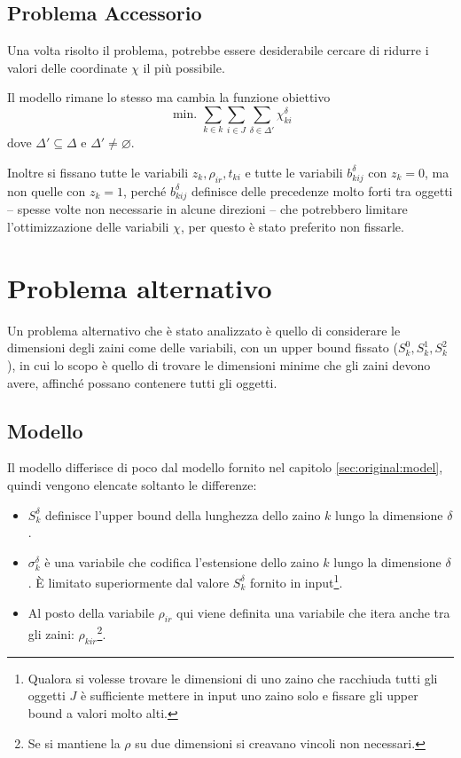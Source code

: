 \documentclass{scrartcl}
\begin{document}
\subsection{Problema Accessorio}
\label{sec:orig:problemaAcessorio}
Una volta risolto il problema, potrebbe essere desiderabile cercare di ridurre i valori delle coordinate
$\chi$ il più possibile.

Il modello rimane lo stesso ma cambia la funzione obiettivo
\begin{equation}
\text{ min. } \sum_{k\in k}\sum_{i \in J}\sum_{\delta \in \Delta'} \chi_{ki}^\delta
\end{equation}
dove $\Delta' \subseteq \Delta$ e $\Delta' \neq \varnothing$.

Inoltre si fissano tutte le variabili $z_k, \rho_{ir}, t_{ki}$ e tutte le variabili $b_{kij}^\delta$ con $z_k = 0$, ma non quelle con $z_k = 1$, perché $b_{kij}^\delta$ definisce delle precedenze molto forti tra oggetti -- spesse volte non necessarie in alcune direzioni -- che potrebbero limitare l'ottimizzazione delle variabili $\chi$, per questo è stato preferito non fissarle.


\section{Problema alternativo}
\label{sec:extension2}
Un problema alternativo che è  stato analizzato è quello di considerare le dimensioni degli zaini come delle variabili, con un upper bound fissato ($S_k^0, S_k^1, S_k^2$), in cui lo scopo è quello di trovare le dimensioni minime che gli zaini devono avere, affinché possano contenere tutti gli oggetti.

\subsection{Modello}
Il modello differisce di poco dal modello fornito nel capitolo \ref{sec:original:model}, quindi vengono elencate soltanto le differenze:
\begin{itemize}
	\item $S_k^\delta$ definisce l'upper bound della lunghezza dello zaino $k$ lungo la dimensione $\delta$.
	
	\item $\sigma_k^\delta$ è una variabile che codifica l'estensione dello zaino $k$ lungo la dimensione $\delta$. È limitato superiormente dal valore $S_k^\delta$ fornito in input\footnote{Qualora si volesse trovare le dimensioni di uno zaino che racchiuda tutti gli oggetti $J$ è sufficiente
	mettere in input uno zaino solo e fissare gli upper bound a valori molto alti.}. 
	
	\item Al posto della variabile $\rho_{ir}$ qui viene definita una variabile che itera anche tra gli zaini:
	$\rho_{kir}$\footnote{Se si mantiene la $\rho$ su due dimensioni si creavano vincoli non necessari.}.
\end{itemize}
\end{document}
